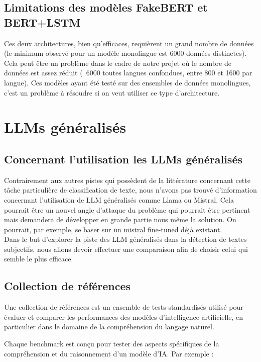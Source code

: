 \documentclass[11pt]{rapport_class}
\begin{document}
\section{Limitations des modèles FakeBERT et BERT+LSTM}
\qquad Ces deux architectures, bien qu’efficaces, requièrent un grand nombre de données (le minimum observé pour un modèle monolingue est 6000 données distinctes). Cela peut être un problème dans le cadre de notre projet où le nombre de données est assez réduit (~6000 toutes langues confondues, entre 800 et 1600 par langue). Ces modèles ayant été testé sur des ensembles de données monolingues, c’est un problème à résoudre si on veut utiliser ce type d’architecture.




    
\chapter{LLMs généralisés}

\section{Concernant l’utilisation les LLMs généralisés}
\qquad Contrairement aux autres pistes qui possèdent de la littérature concernant cette tâche particulière de classification de texte, nous n’avons pas trouvé d’information concernant l’utilisation de LLM généralisés comme Llama ou Mistral. Cela pourrait être un nouvel angle d’attaque du problème qui pourrait être pertinent mais demandera de développer en grande partie nous même la solution. On pourrait, par exemple, se baser sur un mistral fine-tuned déjà existant. \\
Dans le but d'explorer la piste des LLM généralisés dans la détection de textes subjectifs, nous allons devoir effectuer une comparaison afin de choisir celui qui semble le plus efficace.

\section{Collection de références}
\qquad Une collection de références est un ensemble de tests standardisés utilisé pour évaluer et comparer les performances des modèles d'intelligence artificielle, en particulier dans le domaine de la compréhension du langage naturel. 


Chaque benchmark est conçu pour tester des aspects spécifiques de la compréhension et du raisonnement d'un modèle d'IA. Par exemple :
\end{document}
